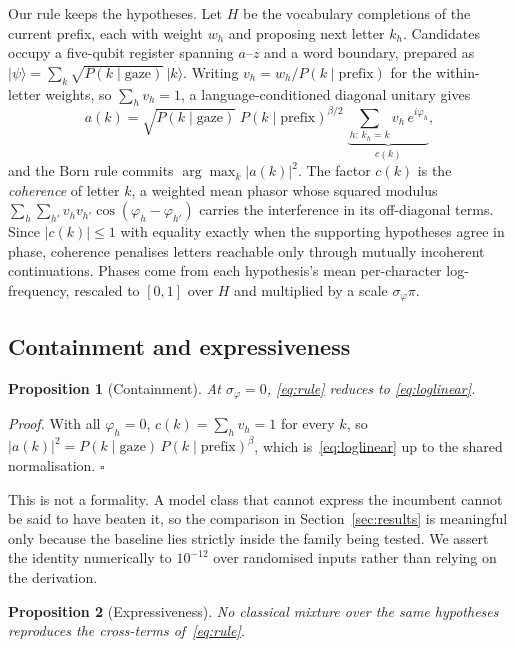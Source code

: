 \documentclass[conference]{IEEEtran}
\newtheorem{proposition}{Proposition}
\begin{document}
Our rule keeps the hypotheses. Let $H$ be the vocabulary completions of the
current prefix, each with weight $w_h$ and proposing next letter $k_h$.
Candidates occupy a five-qubit register spanning $a$--$z$ and a word boundary,
prepared as $\lvert\psi\rangle = \sum_k \sqrt{P(k\mid\text{gaze})}\,\lvert
k\rangle$. Writing $v_h = w_h / P(k \mid \text{prefix})$ for the within-letter
weights, so $\sum_h v_h = 1$, a language-conditioned diagonal unitary gives
\begin{equation}
a(k) = \sqrt{P(k \mid \text{gaze})}\;
       P(k \mid \text{prefix})^{\beta/2}\;
       \underbrace{\textstyle\sum_{h:\,k_h = k} v_h\, e^{i\varphi_h}}_{c(k)},
\label{eq:rule}
\end{equation}
and the Born rule commits $\arg\max_k \lvert a(k)\rvert^{2}$. The factor $c(k)$
is the \emph{coherence} of letter $k$, a weighted mean phasor whose squared
modulus $\sum_{h}\sum_{h'} v_h v_{h'} \cos(\varphi_h - \varphi_{h'})$ carries
the interference in its off-diagonal terms. Since $\lvert c(k)\rvert \le 1$ with
equality exactly when the supporting hypotheses agree in phase, coherence
penalises letters reachable only through mutually incoherent continuations.
Phases come from each hypothesis's mean per-character log-frequency, rescaled to
$[0,1]$ over $H$ and multiplied by a scale $\sigma_\varphi\pi$.

\subsection{Containment and expressiveness}

\begin{proposition}[Containment]
\label{prop:contain}
At $\sigma_\varphi = 0$, \eqref{eq:rule} reduces to \eqref{eq:loglinear}.
\end{proposition}

\noindent\emph{Proof.} With all $\varphi_h = 0$, $c(k) = \sum_h v_h = 1$ for
every $k$, so $\lvert a(k)\rvert^{2} = P(k\mid\text{gaze})\,
P(k\mid\text{prefix})^{\beta}$, which is~\eqref{eq:loglinear} up to the shared
normalisation. $\square$

This is not a formality. A model class that cannot express the incumbent cannot
be said to have beaten it, so the comparison in Section~\ref{sec:results} is
meaningful only because the baseline lies strictly inside the family being
tested. We assert the identity numerically to $10^{-12}$ over randomised inputs
rather than relying on the derivation.

\begin{proposition}[Expressiveness]
\label{prop:express}
No classical mixture over the same hypotheses reproduces the cross-terms
of~\eqref{eq:rule}.
\end{proposition}
\end{document}
